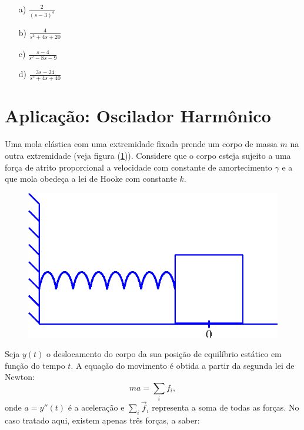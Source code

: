 \begin{resp}
\begin{itemize}
   \item[a)] $\displaystyle \frac{2}{(s-3)^3}$
  \item[b)] $\displaystyle \frac{4}{s^2 +4s +20}$
  \item[c)] $\displaystyle \frac{s-4}{s^2 - 8s - 9}$
  \item[d)] $\displaystyle \frac{3s -24}{s^2 +4s + 40}$
\end{itemize}
  \end{resp}
\section{Aplicação: Oscilador Harmônico}
Uma mola elástica com uma extremidade fixada prende um corpo de massa $m$ na outra extremidade (veja figura (\ref{massa-mola})). Considere que o corpo esteja sujeito a uma força de atrito proporcional a velocidade com constante de amortecimento $\gamma$ e a que mola obedeça a lei de Hooke com constante $k$.
\begin{figure}[!ht]
\begin{center}

\includegraphics{cap_trans_int/pics/figura_1}\end{center}
\caption{\label{massa-mola}}
\end{figure} 
Seja $y(t)$ o deslocamento do corpo da sua posição de equilíbrio estático em função do tempo $t$. A equação do movimento é obtida a partir da segunda lei de Newton:
\begin{equation}
ma=\sum_i f_i,
\end{equation}
onde $a=y''(t)$ é a aceleração e $\sum_i \vec{f}_i$ representa a soma de todas as forças. No caso tratado aqui, existem apenas três forças, a saber:

